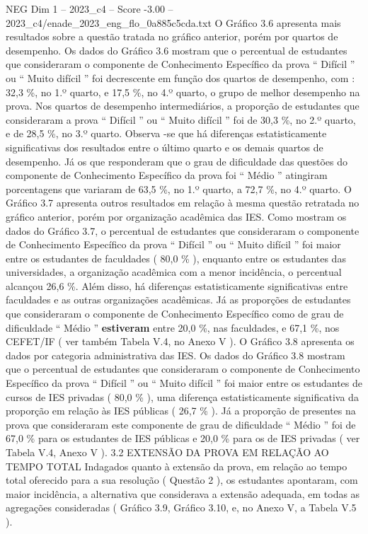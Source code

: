 \begin{textsample}{NEG Dim 1 – 2023\_c4 – Score -3.00 – 2023\_c4/enade\_2023\_eng\_flo\_0a885c5cda.txt}
O Gráfico 3.6 apresenta mais resultados sobre a questão tratada no gráfico anterior, porém por quartos de desempenho.
Os dados do Gráfico 3.6 mostram que o percentual de estudantes que consideraram o componente de Conhecimento Específico da prova “ Difícil ” ou “ Muito difícil ” foi decrescente em função dos quartos de desempenho, com : 32,3 \%, no 1.º quarto, e 17,5 \%, no 4.º quarto, o grupo de melhor desempenho na prova.
Nos quartos de desempenho intermediários, a proporção de estudantes que consideraram a prova “ Difícil ” ou “ Muito difícil ” foi de 30,3 \%, no 2.º quarto, e de 28,5 \%, no 3.º quarto.
Observa -se que há diferenças estatisticamente significativas dos resultados entre o último quarto e os demais quartos de desempenho.
Já os que responderam que o grau de dificuldade das questões do componente de Conhecimento Específico da prova foi “ Médio ” atingiram porcentagens que variaram de 63,5 \%, no 1.º quarto, a 72,7 \%, no 4.º quarto.
O Gráfico 3.7 apresenta outros resultados em relação à mesma questão retratada no gráfico anterior, porém por organização acadêmica das IES.
Como mostram os dados do Gráfico 3.7, o percentual de estudantes que consideraram o componente de Conhecimento Específico da prova “ Difícil ” ou “ Muito difícil ” foi maior entre os estudantes de faculdades ( 80,0 \% ), enquanto entre os estudantes das universidades, a organização acadêmica com a menor incidência, o percentual alcançou 26,6 \%.
Além disso, há diferenças estatisticamente significativas entre faculdades e as outras organizações acadêmicas.
Já as proporções de estudantes que consideraram o componente de Conhecimento Específico como de grau de dificuldade “ Médio ” \textbf{estiveram} entre 20,0 \%, nas faculdades, e 67,1 \%, nos CEFET/IF ( ver também Tabela V.4, no Anexo V ).
O Gráfico 3.8 apresenta os dados por categoria administrativa das IES.
Os dados do Gráfico 3.8 mostram que o percentual de estudantes que consideraram o componente de Conhecimento Específico da prova “ Difícil ” ou “ Muito difícil ” foi maior entre os estudantes de cursos de IES privadas ( 80,0 \% ), uma diferença estatisticamente significativa da proporção em relação às IES públicas ( 26,7 \% ).
Já a proporção de presentes na prova que consideraram este componente de grau de dificuldade “ Médio ” foi de 67,0 \% para os estudantes de IES públicas e 20,0 \% para os de IES privadas ( ver Tabela V.4, Anexo V ). 3.2 EXTENSÃO DA PROVA EM RELAÇÃO AO TEMPO TOTAL Indagados quanto à extensão da prova, em relação ao tempo total oferecido para a sua resolução ( Questão 2 ), os estudantes apontaram, com maior incidência, a alternativa que considerava a extensão adequada, em todas as agregações consideradas ( Gráfico 3.9, Gráfico 3.10, e, no Anexo V, a Tabela V.5 ).

\end{textsample}
